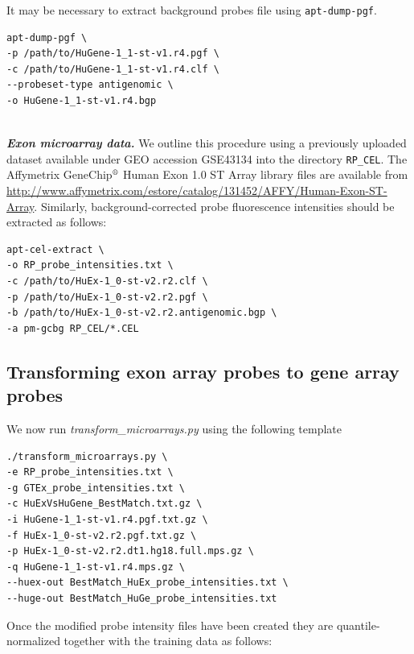 \documentclass[a4paper,12pt]{article}
\begin{document}
It may be necessary to extract background probes file using \texttt{apt-dump-pgf}.

\begin{verbatim}
apt-dump-pgf \
-p /path/to/HuGene-1_1-st-v1.r4.pgf \
-c /path/to/HuGene-1_1-st-v1.r4.clf \
--probeset-type antigenomic \
-o HuGene-1_1-st-v1.r4.bgp
\end{verbatim}

\noindent\\
\textbf{\textit{Exon microarray data.}} We outline this procedure using a previously uploaded dataset available under GEO accession GSE43134 into the directory \texttt{RP\_CEL}. The Affymetrix GeneChip$^{\text{\textregistered}}$ Human Exon 1.0 ST Array library files are available from \url{http://www.affymetrix.com/estore/catalog/131452/AFFY/Human-Exon-ST-Array}. Similarly, background-corrected probe fluorescence intensities should be extracted as follows:

\begin{verbatim}
apt-cel-extract \
-o RP_probe_intensities.txt \
-c /path/to/HuEx-1_0-st-v2.r2.clf \
-p /path/to/HuEx-1_0-st-v2.r2.pgf \
-b /path/to/HuEx-1_0-st-v2.r2.antigenomic.bgp \
-a pm-gcbg RP_CEL/*.CEL
\end{verbatim}

\subsection{Transforming exon array probes to gene array probes}

We now run \textit{transform\_microarrays.py} using the following template

\begin{verbatim}
./transform_microarrays.py \
-e RP_probe_intensities.txt \
-g GTEx_probe_intensities.txt \
-c HuExVsHuGene_BestMatch.txt.gz \
-i HuGene-1_1-st-v1.r4.pgf.txt.gz \
-f HuEx-1_0-st-v2.r2.pgf.txt.gz \
-p HuEx-1_0-st-v2.r2.dt1.hg18.full.mps.gz \
-q HuGene-1_1-st-v1.r4.mps.gz \
--huex-out BestMatch_HuEx_probe_intensities.txt \
--huge-out BestMatch_HuGe_probe_intensities.txt
\end{verbatim}

Once the modified probe intensity files have been created they are quantile-normalized
together with the training data as follows:
\end{document}
